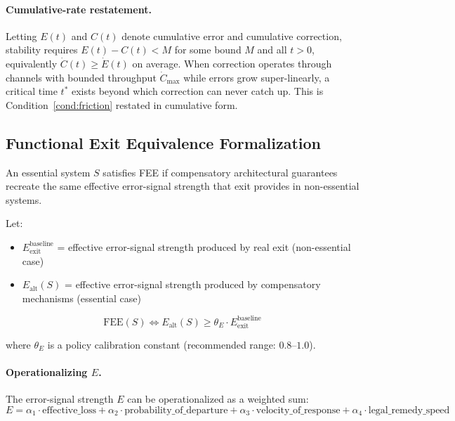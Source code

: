 \documentclass{article}
\begin{document}
\paragraph{Cumulative-rate restatement.} Letting $E(t)$ and $C(t)$ denote cumulative error and cumulative correction, stability requires $E(t) - C(t) < M$ for some bound $M$ and all $t > 0$, equivalently $\dot{C}(t) \geq \dot{E}(t)$ on average. When correction operates through channels with bounded throughput $\dot{C}_{\max}$ while errors grow super-linearly, a critical time $t^*$ exists beyond which correction can never catch up. This is Condition~\ref{cond:friction} restated in cumulative form.

\subsection{Functional Exit Equivalence Formalization}

An essential system $S$ satisfies FEE if compensatory architectural guarantees recreate the same effective error-signal strength that exit provides in non-essential systems.

Let:
\begin{itemize}[noitemsep]
    \item $E_{\text{exit}}^{\text{baseline}}$ = effective error-signal strength produced by real exit (non-essential case)
    \item $E_{\text{alt}}(S)$ = effective error-signal strength produced by compensatory mechanisms (essential case)
\end{itemize}

\begin{equation}
\text{FEE}(S) \iff E_{\text{alt}}(S) \geq \theta_E \cdot E_{\text{exit}}^{\text{baseline}}
\label{eq:fee}
\end{equation}

where $\theta_E$ is a policy calibration constant (recommended range: $0.8$--$1.0$).

\paragraph{Operationalizing $E$.} The error-signal strength $E$ can be operationalized as a weighted sum:
\begin{equation}
E = \alpha_1 \cdot \text{effective\_loss} + \alpha_2 \cdot \text{probability\_of\_departure} + \alpha_3 \cdot \text{velocity\_of\_response} + \alpha_4 \cdot \text{legal\_remedy\_speed}
\label{eq:error-signal}
\end{equation}
\end{document}
